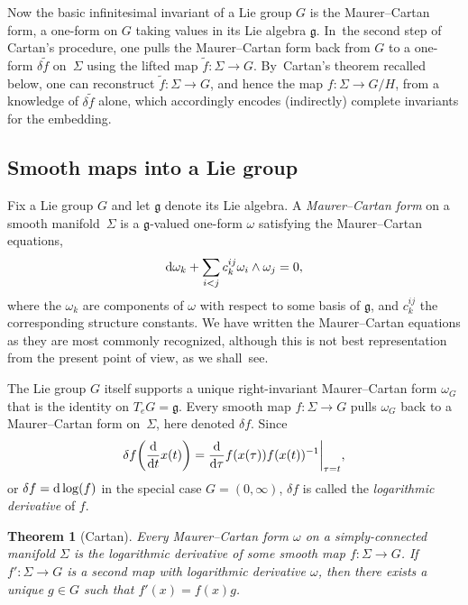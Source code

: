 \documentclass[pdftex]{sigma}%
\numberwithin{equation}{section}
\newtheorem{Theorem}{Theorem}[section]
\begin{document}
Now the basic infinitesimal invariant of a Lie group $G$ is the
Maurer--Cartan form, a one-form on $G$ taking values in its Lie algebra
${\mathfrak g} $. In~the second step of Cartan's procedure, one pulls
the Maurer--Cartan form back from $G$ to a one-form $\delta\tilde f $
on~$\Sigma $ using the lifted map $\tilde f \colon \Sigma \rightarrow
G$. By~Cartan's theorem recalled below, one can reconstruct $\tilde f
\colon \Sigma \rightarrow G$, and hence the map $f \colon \Sigma
\rightarrow G/H$, from a knowledge of $\delta\tilde f $ alone, which
accordingly encodes (indirectly) complete invariants for the
embedding.

\subsection*{Smooth maps into a Lie group}

Fix a Lie group $G$ and let ${\mathfrak g}$ denote its Lie algebra. A
{\it Maurer--Cartan form} on a smooth mani\-fold~$\Sigma $ is a
${\mathfrak g}$-valued one-form $\omega $ satisfying the Maurer--Cartan
equations,
\begin{equation*}
{\rm d} \omega_k + \sum_{i<j}c_k^{ij}\omega_i \wedge
\omega_j =0,
\end{equation*}
where the $\omega_k$ are components of $\omega$ with
respect to some basis of ${\mathfrak g} $, and $c_k^{ij}$ the
corresponding structure constants. We have written the Maurer--Cartan
equations as they are most commonly recognized, although this is not
best representation from the present point of view, as we shall~see.

The Lie group $G$ itself supports a unique right-invariant
Maurer--Cartan form $\omega_G$ that is the identity on
$T_e{G}={\mathfrak g} $. Every smooth map $f \colon \Sigma \rightarrow
G$ pulls $\omega_G$ back to a Maurer--Cartan form on~$\Sigma $, here
denoted $\delta f$. Since
\begin{equation*}
\delta f \bigg(\frac{\rm d}{{\rm d}t}x(t)\bigg)
=\frac{\rm d}{{\rm d}\tau}f(x(\tau))f(x(t))^{-1}\bigg|_{\tau=t},
\end{equation*}
or $\delta f = {\rm d}\log(f)$ in the special case
$G=(0,\infty)$, $\delta f$ is called the {\it logarithmic derivative}
of $f$.

\begin{Theorem}[Cartan]\label{tslT} Every Maurer--Cartan form $\omega$ on a
simply-connected manifold $\Sigma $ is the logarithmic derivative of
some smooth map $f \colon \Sigma \rightarrow G$. If $f' \colon \Sigma
\rightarrow G$ is a second map with logarithmic derivative $\omega $,
then there exists a unique $g \in G$ such that $f'(x)=f(x)g$.
\end{Theorem}
\end{document}
